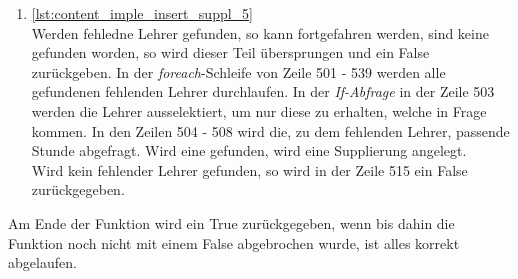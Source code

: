 \begin{enumerate}
\item \autoref{lst:content_imple_insert_suppl_5}\\
Werden fehledne Lehrer gefunden, so kann fortgefahren werden, sind keine gefunden worden, so wird dieser Teil übersprungen und ein False zurückgeben. In der \textit{foreach}-Schleife von Zeile 501 - 539 werden alle gefundenen fehlenden Lehrer durchlaufen. In der \textit{If-Abfrage} in der Zeile 503 werden die Lehrer ausselektiert, um nur diese zu erhalten, welche in Frage kommen. In den Zeilen 504 - 508 wird die, zu dem fehlenden Lehrer, passende Stunde abgefragt. Wird eine gefunden, wird eine Supplierung angelegt.\\
Wird kein fehlender Lehrer gefunden, so wird in der Zeile 515 ein False zurückgegeben.



\end{enumerate}
Am Ende der Funktion wird ein True zurückgegeben, wenn bis dahin die Funktion noch nicht mit einem False abgebrochen wurde, ist alles korrekt abgelaufen.

